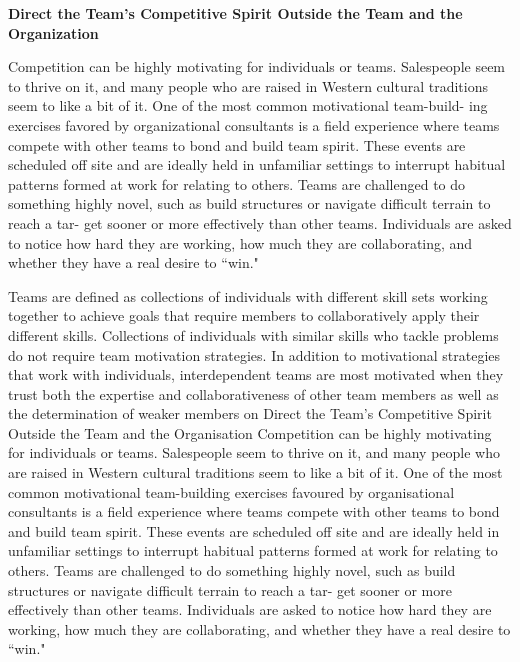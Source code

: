 \textbf{Direct the Team’s Competitive Spirit Outside the Team and the Organization}

Competition can be highly motivating for individuals or teams. Salespeople seem to thrive on it, and many people who are raised in Western cultural traditions seem to like a bit of it. One of the most common motivational team-build- ing exercises favored by organizational consultants is a field experience where teams compete with other teams to bond and build team spirit. These events are scheduled off site and are ideally held in unfamiliar settings to interrupt habitual patterns formed at work for relating to others. Teams are challenged to do something highly novel, such as build structures or navigate difficult terrain to reach a tar- get sooner or more effectively than other teams. Individuals are asked to notice how hard they are working, how much they are collaborating, and whether they have a real desire to ``win."

Teams are defined as collections of individuals with different skill sets working together to achieve goals that require members to collaboratively apply their different skills. Collections of individuals with similar skills who tackle problems do not require team motivation strategies. In addition to motivational strategies that work with individuals, interdependent teams are most motivated when they trust both the expertise and collaborativeness of other team members as well as the determination of weaker members on Direct the Team’s Competitive Spirit Outside the Team and the Organisation
Competition can be highly motivating for individuals or teams. Salespeople seem to thrive on it, and many people who are raised in Western cultural traditions seem to like a bit of it. One of the most common motivational team-building exercises favoured by organisational consultants is a field experience where teams compete with other teams to bond and build team spirit. These events are scheduled off site and are ideally held in unfamiliar settings to interrupt habitual patterns formed at work for relating to others. Teams are challenged to do something highly novel, such as build structures or navigate difficult terrain to reach a tar- get sooner or more effectively than other teams. Individuals are asked to notice how hard they are working, how much they are collaborating, and whether they have a real desire to ``win."

